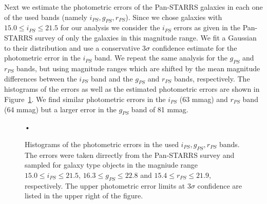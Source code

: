 \documentclass[iop, apjl, twocolappendix, numberedappendix]{emulateapj}
\begin{document}
Next we estimate the photometric errors of the Pan-STARRS galaxies in each one of the used
bands (namely $i_{PS}, g_{PS}, r_{PS}$). Since we chose galaxies with $15.0 \leq i_{PS} \leq 21.5$
for our analysis we consider the $i_{PS}$ errors as given in the Pan-STARRS survey of only 
the galaxies in this magnitude range. We fit a Gaussian to their distribution and use a conservative $3\sigma$ confidence
estimate for the photometric error in the $i_{PS}$ band. We repeat the same analysis for the
$g_{PS}$ and $r_{PS}$ bands, but using magnitude ranges which are shifted by the mean magnitude
differences between the $i_{PS}$ band and the $g_{PS}$ and $r_{PS}$ bands, respectively.
The histograms of the errors as well as the estimated photometric errors are shown in
Figure~\ref{fig:photoerrors}. We find similar photometric errors in the $i_{PS}$ (63 mmag)
and $r_{PS}$ band (64 mmag) but a larger error in the $g_{PS}$ band of 81 mmag.

\begin{figure}
\caption{Histograms of the photometric errors in the used $i_{PS}, g_{PS}, r_{PS}$ bands.
The errors were taken dirrectly from the Pan-STARRS survey and sampled for galaxy type 
objects in the magniude range $15.0 \leq i_{PS} \leq 21.5$, $16.3 \leq g_{PS} \leq 22.8$ and $15.4 \leq r_{PS} \leq 21.9$, respectively. 
The upper photometric error limits at $3\sigma$
confidence are listed in the upper right of the figure.}
    \label{fig:photoerrors}•
\end{figure}
\end{document}
